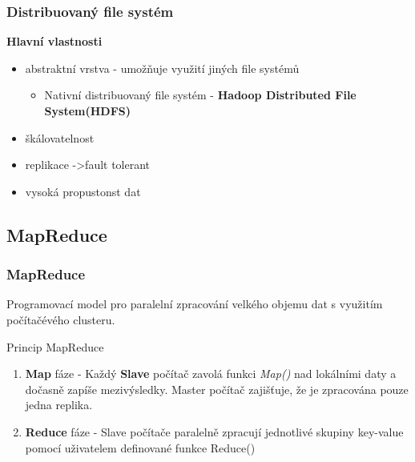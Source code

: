 \documentclass[unicode,bookmarksnumbered]{beamer}
\begin{document}
	\begin{frame}
		\frametitle{Distribuovaný file systém}
		\textbf{Hlavní vlastnosti}
		\begin{itemize}
			\item abstraktní vrstva - umožňuje využití jiných file systémů
			\begin{itemize}
				\item 		Nativní distribuovaný file systém - \textbf{Hadoop Distributed File System(HDFS)}
			\end{itemize}
			\item škálovatelnost 
			\item replikace ->fault tolerant
			\item vysoká propustonst dat
		\end{itemize}

	\end{frame}
%


%


	\subsection{MapReduce} 
	\begin{frame}
		\frametitle{MapReduce} 
		Programovací model pro paralelní zpracování velkého objemu dat s využitím
počítačévého clusteru.
		
		Princip MapReduce   
		\begin{enumerate}
			\item \textbf{Map} fáze - Každý \textbf{Slave} počítač zavolá funkci
\textit{Map()} nad lokálními daty a dočasně zapíše mezivýsledky. Master počítač
zajišťuje, že je zpracována pouze jedna replika.
			\item \textbf{Reduce} fáze - Slave počítače paralelně zpracují jednotlivé
skupiny key-value pomocí uživatelem definované funkce Reduce()
		\end{enumerate}
	\end{frame}
%
\end{document}
